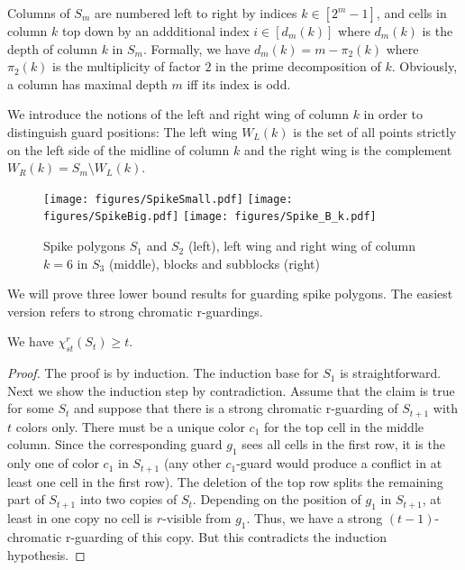 \documentclass[a4paper,USenglish,numberwithinsect]{lipics}
\theoremstyle{plain}
\begin{document}
Columns of $S_m$ are numbered  left to right by indices $k \in
[2^m -1]$,
and  cells in column $k$ top down by an addditional index $i \in
[d_m(k)]$ where
$d_m(k)$ is the depth of column $k$ in $S_m$. Formally, we have
$d_m(k)=m-\pi_2(k)$  where $\pi_2(k)$ is the multiplicity of  factor
$2$ in the prime decomposition of $k$.  
Obviously, a column has maximal depth $m$ iff its index is odd.

We introduce the notions of the left and right wing of  column $k$ in
order to distinguish
guard positions: The left wing $W_L(k)$ is the set of all points
strictly on the left side of the midline of column $k$  and the
right wing is  the complement $W_R(k) = S_m \setminus W_L(k)$.

\begin{figure}
\centering
\texttt{[image: figures/SpikeSmall.pdf]} \qquad
\texttt{[image: figures/SpikeBig.pdf]}       \qquad
\texttt{[image: figures/Spike\_B\_k.pdf]}
\caption{Spike polygons $S_1$ and $S_2$ (left), left wing and right wing
of column $k=6$ in $S_3$ (middle), blocks and
  subblocks (right)}
\label{spikePoly}
\end{figure}




We will prove three lower bound results for guarding spike polygons. 
The easiest version refers to strong chromatic
r-guardings.

\noindent
\begin{theorem}
We have $\chi_{st}^r(S_t) \geq t$.
\end{theorem}
\begin{proof} The proof is by induction. The induction base for $S_1$ is straightforward.
Next we show the induction step by contradiction. Assume that the claim is true for some  $S_t$  and suppose that there is  a
strong chromatic r-guarding of $S_{t+1}$ with $t$ colors only.
There must be a unique color $c_1$ for the top cell in the middle
column. Since the
corresponding guard $g_1$ sees all cells in the first row, it is
the only one of color $c_1$ in $S_{t+1}$
(any other $c_1$-guard  would produce a conflict in at least one cell in
the first row).
The deletion of the  top row splits the remaining part of  $S_{t+1}$
into two copies of $S_t$.
Depending on the position of $g_1$ in $S_{t+1}$, at least in one  copy  no cell is
$r$-visible from $g_1$.
Thus, we have  a strong $(t-1)$-chromatic r-guarding  of this copy.
But this contradicts
 the induction hypothesis.\end{proof}
\end{document}
